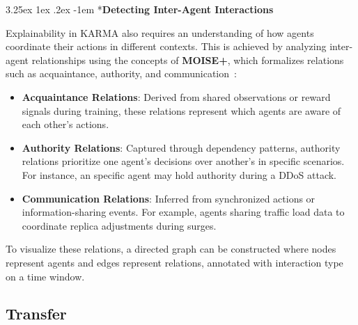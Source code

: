 \documentclass[conference]{IEEEtran}
\makeatletter
\renewcommand\paragraph{\@startsection{paragraph}{5}{\z@}%
  {3.25ex \@plus1ex \@minus.2ex}%
  {-1em}%
  {\normalfont\normalsize\bfseries}}
\makeatother
\begin{document}
\paragraph*{\textbf{Detecting Inter-Agent Interactions}}

Explainability in KARMA also requires an understanding of how agents coordinate their actions in different contexts. This is achieved by analyzing inter-agent relationships using the concepts of \textbf{MOISE+}, which formalizes relations such as acquaintance, authority, and communication~\cite{hubner2002moise}:
\begin{itemize}
    \item \textbf{Acquaintance Relations}: Derived from shared observations or reward signals during training, these relations represent which agents are aware of each other's actions.
    \item \textbf{Authority Relations}: Captured through dependency patterns, authority relations prioritize one agent's decisions over another's in specific scenarios. For instance, an specific agent may hold authority during a DDoS attack.
    \item \textbf{Communication Relations}: Inferred from synchronized actions or information-sharing events. For example, agents sharing traffic load data to coordinate replica adjustments during surges.
\end{itemize}

To visualize these relations, a directed graph can be constructed where nodes represent agents and edges represent relations, annotated with interaction type on a time window.




\subsection{Transfer}
\label{sec:transfer}
\end{document}
